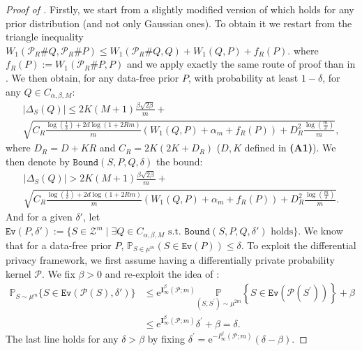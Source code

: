 \begin{proof}[Proof of ]
Firstly, we start from a slightly modified version of  which holds for any prior distribution (and not only Gaussian ones).
To obtain it we restart from the triangle inequality $W_1(\mathcal{P}_R\#Q, \mathcal{P}_R\#P ) \leq W_1(\mathcal{P}_R\#Q,Q) + W_1(Q,P) + f_R(P)$. where $f_R(P) := W_1(\mathcal{P}_R\#P,P)$ and we apply exactly the same route of proof than in . We then obtain, for any data-free prior $P$, with probability at least $1-\delta$, for any $Q\in C_{\alpha,\beta,M}$:
\begin{multline*}
|\Delta_S(Q)| \leq 2K(M+1)\frac{\beta\sqrt{2\beta}}{m} + \\
\sqrt{ C_R \frac{\log(\frac{1}{\delta}) + 2d\log\left(1 +2Rm \right)}{m} \left(W_1( Q, P)+\alpha_m  + f_R(P)\right) + D_R^2\frac{\log\left( \frac{m}{\delta} \right)}{m} },
\end{multline*}
where $D_R= D+KR$ and $C_R= 2K(2K+D_R)$ ($D,K$ defined in \textbf{(A1)}).
We then denote by $\texttt{Bound}(S,P,Q,\delta)$ the bound:
\begin{multline*}
|\Delta_S(Q)| > 2K(M+1)\frac{\beta\sqrt{2\beta}}{m} + \\
\sqrt{ C_R \frac{\log(\frac{1}{\delta}) + 2d\log\left(1 +2Rm \right)}{m} \left(W_1( Q, P)+\alpha_m  + f_R(P)\right) + D_R^2\frac{\log\left( \frac{m}{\delta} \right)}{m} }.
\end{multline*}
And for a given $\delta'$, let $\texttt{Ev}(P,\delta'):= \{S \in \mathcal{Z}^m \mid  \exists Q \in C_{\alpha,\beta,M} \text{ s.t. } \texttt{Bound}(S,P,Q,\delta') \text{ holds} \}$.
We know that for a data-free prior $P$, $\mathbb{P}_{S\in\mu^m}(S\in \texttt{Ev}(P)) \leq \delta$.
To exploit the differential privacy framework, we first assume having a differentially private probability kernel $\mathcal{P}$. We fix $\beta>0$ and re-exploit the idea of \citet{dziugaite2018data}:
\begin{align}
\label{eq: pac_b_diff_priv}
\mathbb{P}_{S \sim \mu^m}\{S \in \texttt{Ev}(\mathcal{P}(S),\delta')\} & \leq \mathrm{e}^{\mathbf{I}_{\infty}^\beta(\mathcal{P} ; m)} \underset{\left(S, S^{\prime}\right) \sim \mu^{2m} }{\mathbb{P}}\left\{S \in \texttt{Ev}\left(\mathcal{P}\left(S^{\prime}\right)\right)\right\}+\beta \\
& \leq \mathrm{e}^{\mathbf{I}_{\infty}^\beta(\mathcal{P} ; m)} \delta^{\prime}+\beta = \delta .
\end{align}
The last line holds for any $\delta > \beta$ by fixing $\delta^{\prime}=\mathrm{e}^{-I_{\infty}^\beta(\mathcal{P} ; m)}(\delta-\beta)$.

\end{proof}
